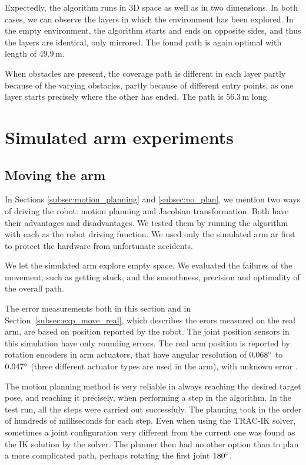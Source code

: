 \documentclass[buriama8_dp.tex]{subfiles}
\begin{document}
Expectedly, the algorithm runs in 3D space as well as in two dimensions. In both cases, we can observe the layers in which the environment has been explored. In the empty environment, the algorithm starts and ends on opposite sides, and thus the layers are identical, only mirrored. The found path is again optimal with length of 49.9\,m.

When obstacles are present, the coverage path is different in each layer partly because of the varying obstacles, partly because of different entry points, as one layer starts precisely where the other has ended. The path is 56.3\,m long.


\section{Simulated arm experiments}
\label{sec:exp_sim_arm}

\subsection{Moving the arm}
\label{subsec:exp_move_sim}

In Sections \ref{subsec:motion_planning} and \ref{subsec:no_plan}, we mention two ways of driving the robot: motion planning and Jacobian transformation. Both have their advantages and disadvantages. We tested them by running the algorithm with each as the robot driving function. We used only the simulated arm ar first to protect the hardware from unfortunate accidents.

We let the simulated arm explore empty space. We evaluated the failures of the movement, such as getting stuck, and the smoothness, precision and optimality of the overall path.

 The error measurements both in this section and in Section~\ref{subsec:exp_move_real}, which describes the erors measured on the real arm, are based on position reported by the robot. The joint position sensors in this simulation have only rounding errors. The real arm position is reported by rotation encoders in arm actuators, that have angular resolution of \(0.068^\circ\) to \(0.047^\circ\) (three different actuator types are used in the arm), with unknown error \cite{jaco_joint_spec}.

The motion planning method is very reliable in always reaching the desired target pose, and reaching it precisely, when performing a step in the algorithm. In the test run, all the steps were carried out successfuly. The planning took in the order of hundreds of milliseconds for each step. Even when using the TRAC-IK solver, sometimes a joint configuration  very different from the current one was found as the IK solution by the solver. The planner then had no other option than to plan a more complicated path, perhaps rotating the first joint \(180^\circ\).
\end{document}
